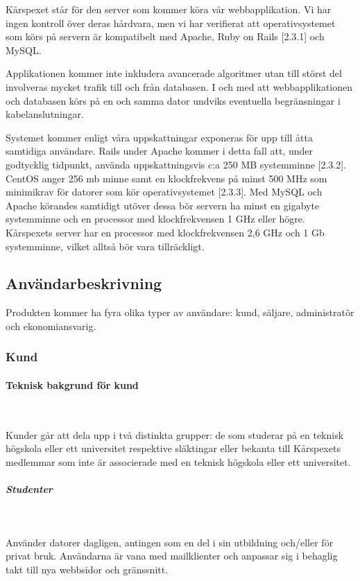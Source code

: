 \documentclass[a4paper, twoside, 11pt, titlepage]{article}
\begin{document}
		Kårspexet står för den server som kommer köra vår webbapplikation. Vi har ingen kontroll över deras hårdvara, men vi har verifierat att operativsystemet som körs på servern är kompatibelt med Apache, Ruby on Rails [2.3.1] och MySQL.

		Applikationen kommer inte inkludera avancerade algoritmer utan till störst del involveras mycket trafik till och från databasen. I och med att webbapplikationen och databasen körs på en och samma dator undviks eventuella begränsningar i kabelanslutningar.

		Systemet kommer enligt våra uppskattningar exponeras för upp till åtta samtidiga användare. Rails under Apache kommer i detta fall att, under godtycklig tidpunkt, använda uppskattningsvis c:a 250 MB systemminne [2.3.2]. CentOS anger 256 mb minne samt en klockfrekvens på minst 500 MHz som minimikrav för datorer som kör operativsystemet [2.3.3]. Med MySQL och Apache körandes samtidigt utöver dessa bör servern ha minst en gigabyte systemminne och en processor med klockfrekvensen 1 GHz eller högre. Kårspexets server har en processor med klockfrekvensen 2,6 GHz och 1 Gb systemminne, vilket alltså bör vara tillräckligt.

	\subsection{Användarbeskrivning}


	Produkten kommer ha fyra olika typer av användare: kund, säljare, administratör och ekonomiansvarig.

		\subsubsection{Kund}



			\paragraph{Teknisk bakgrund för kund}\

			Kunder går att dela upp i två distinkta grupper: de som studerar på en teknisk högskola eller ett universitet respektive släktingar eller bekanta till Kårspexets medlemmar som inte är associerade med en teknisk högskola eller ett universitet.

			\subparagraph{\emph{Studenter}}\

				Använder datorer dagligen, antingen som en del i sin utbildning och/eller för privat bruk. Användarna är vana med mailklienter och anpassar sig i behaglig takt till nya webbsidor och gränssnitt.
\end{document}
